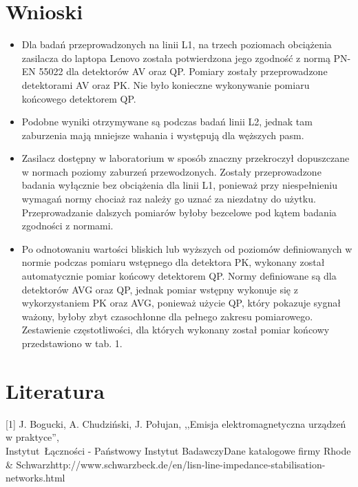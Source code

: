 \documentclass[12pt, a4paper, oneside]{article}
\begin{document}
\section{Wnioski}
\begin{itemize}
\item Dla badań przeprowadzonych na linii L1, na trzech poziomach obciążenia zasilacza do laptopa Lenovo została potwierdzona jego zgodność z normą PN-EN 55022 dla detektorów AV oraz QP. Pomiary zostały przeprowadzone detektorami AV oraz PK. Nie było konieczne wykonywanie pomiaru końcowego detektorem QP.
\item Podobne wyniki otrzymywane są podczas badań linii L2, jednak tam zaburzenia mają mniejsze wahania i występują dla węższych pasm.
\item Zasilacz dostępny w laboratorium w sposób znaczny przekroczył dopuszczane w normach poziomy zaburzeń przewodzonych. Zostały przeprowadzone badania wyłącznie bez obciążenia dla linii L1, ponieważ przy niespełnieniu wymagań normy chociaż raz należy go uznać za niezdatny do użytku. Przeprowadzanie dalszych pomiarów byłoby bezcelowe pod kątem badania zgodności z normami.
\item Po odnotowaniu wartości bliskich lub wyższych od poziomów definiowanych w normie podczas pomiaru wstępnego dla detektora PK, wykonany został automatycznie pomiar końcowy detektorem QP. Normy definiowane są dla detektorów AVG oraz QP, jednak pomiar wstępny wykonuje się z wykorzystaniem PK oraz AVG, ponieważ użycie QP, który pokazuje sygnał ważony, byłoby zbyt czasochłonne dla pełnego zakresu pomiarowego. Zestawienie częstotliwości, dla których wykonany został pomiar końcowy przedstawiono w tab. 1.
\end{itemize}
\clearpage
\section{Literatura}
[1] J. Bogucki, A. Chudziński, J. Połujan, ,,Emisja elektromagnetyczna urządzeń w praktyce'',\\ Instytut~Łączności - Państwowy Instytut Badawczy\newline\newline
[2] Dane katalogowe firmy Rhode \& Schwarz\newline\newline
[3] http://www.schwarzbeck.de/en/lisn-line-impedance-stabilisation-networks.html \newline\newline
\end{document}
